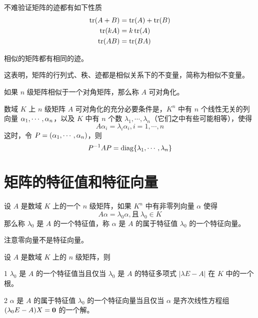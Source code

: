不难验证矩阵的迹都有如下性质
\begin{equation*}
    \begin{aligned}
        \operatorname{tr}(A+B) &= \operatorname{tr}(A) + \operatorname{tr}(B)\\
         \operatorname{tr}(kA) &= k\operatorname{tr}(A)\\
         \operatorname{tr}(AB) &= \operatorname{tr}(BA)
    \end{aligned}
\end{equation*}

\begin{theorem}
    相似的矩阵都有相同的迹。
\end{theorem}

这表明，矩阵的行列式、秩、迹都是相似关系下的不变量，简称为相似不变量。

如果 $n$ 级矩阵相似于一个对角矩阵，那么称 $A$ 可对角化。

\begin{theorem}
    数域 $K$ 上 $n$ 级矩阵 $A$ 可对角化的充分必要条件是，$K^n$ 中有 $n$ 个线性无关的列向量 $\alpha_1,\cdots,\alpha_n$，以及 $K$ 中有 $n$ 个数 $\lambda_1,\cdots,\lambda_n$（它们之中有些可能相等），使得
    \[A\alpha_i = \lambda_i \alpha_i, i=1,\cdots,n\]
    这时，令 $P = (\alpha_1,\cdots,\alpha_n)$，则
    \[P^{-1}AP = \operatorname{diag}\{\lambda_1,\cdots,\lambda_n\}\]
\end{theorem}

\section{矩阵的特征值和特征向量}

\begin{definition}
    设 $A$ 是数域 $K$ 上的一个 $n$ 级矩阵，如果 $K^n$ 中有非零列向量 $\alpha$ 使得
    \[A \alpha = \lambda_0\alpha,\text{且}\ \lambda_0\in K\]
    那么称 $\lambda_0$ 是 $A$ 的一个特征值，称 $\alpha$ 是 $A$ 的属于特征值 $\lambda_0$ 的一个特征向量。
\end{definition}

注意零向量不是特征向量。

\begin{theorem}
    设 $A$ 是数域 $K$ 上的 $n$ 级矩阵，则

    \num{1} $\lambda_0$ 是 $A$ 的一个特征值当且仅当 $\lambda_0$ 是 $A$ 的特征多项式 $|\lambda E-A|$ 在 $K$ 中的一个根。

    \num{2} $\alpha$ 是 $A$ 的属于特征值 $\lambda_0$ 的一个特征向量当且仅当 $\alpha$ 是齐次线性方程组 $(\lambda_0E-A)X = \boldsymbol{0}$  的一个解。
\end{theorem}

